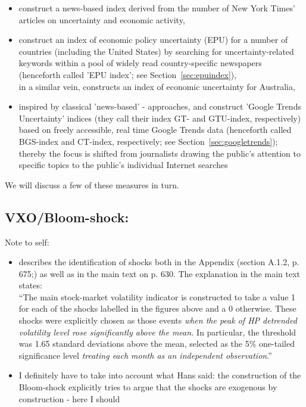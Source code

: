 \documentclass[a4paper,12pt,oneside,pointednumbers,bibtotoc,bigheadings,liststotoc]{scrbook}
\begin{document}
\begin{itemize}
\begin{itemize}
			\begin{itemize}
				\item \citet{alexopoulosandcohen:09} construct a news-based index derived from the number of New York Times' articles on uncertainty and economic activity,
				\item \citet{bakeretal:15} construct an index of economic policy uncertainty (EPU) for a number of countries (including the United States) by searching for uncertainty-related keywords within a pool of widely read country-specific newspapers (henceforth called 'EPU index'; see Section~\ref{sec:epuindex}),\\
			in a similar vein, \citet{moore:17} constructs an index of economic uncertainty for Australia,
				\item inspired by classical 'news-based' - approaches, \citet{bontempietal:16} and \citet{castelnuovoandtran:17} construct 'Google Trends Uncertainty' indices (they call their index GT- and GTU-index, respectively) based on freely accessible, real time Google Trends data (henceforth called BGS-index and CT-index, respectively; see Section~\ref{sec:googletrends}); thereby the focus is shifted from journalists drawing the public's attention to specific topics to the public's individual Internet searches
			\end{itemize}
		\end{itemize}
\end{itemize} 

We will discuss a few of these measures in turn.


\subsection{VXO/Bloom-shock: \citet{bloom:09}}
\label{sec:bloomshock}
\begingroup
    \fontsize{8pt}{12pt}\selectfont
    Note to self:
\begin{itemize}
	\item  \citet{bloom:09} describes the identification of shocks both in the Appendix (section A.1.2, p. 675;) as well as in the main text on p. 630. The explanation in the main text states:\\
``The main stock-market volatility indicator is constructed to take a value 1 for each of the shocks labelled in the figures above and a 0 otherwise. These shocks were explicitly chosen as those events \textit{when the peak of HP detrended volatility level rose significantly above the mean.} In particular, the threshold was 1.65 standard deviations above the mean, selected as the 5\% one-tailed significance level \textit{treating each month as an independent observation}.''
	\item I definitely have to take into account what Hans said: the construction of the Bloom-shock explicitly tries to argue that the shocks are exogenous by construction - here I should 
\end{itemize}
\endgroup
\end{document}
